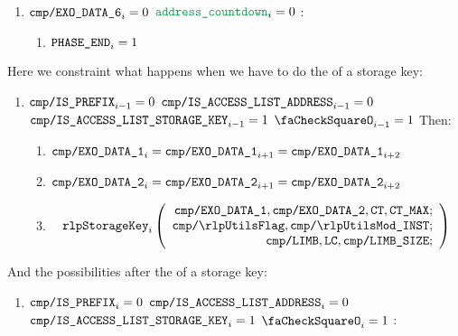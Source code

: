 \begin{enumerate}[resume]
\begin{enumerate}[resume]
\begin{enumerate}
					\item \If $\texttt{cmp}\texttt{/}\texttt{{\texttt{EXO\_DATA\_6}}} _{i} = 0$ \et $\locAddressPrewarmingCountdown _{i} = 0$ \Then:
						\begin{enumerate}
							\item $\texttt{PHASE\_END} _{i} = 1$
						\end{enumerate}
				\end{enumerate}
		\end{enumerate}

		Here we constraint what happens when we have to do the \rlp{} of a storage key:
		\begin{enumerate}[resume]
			\item \If $\texttt{cmp}\texttt{/}\texttt{{\texttt{IS\_PREFIX}}} _{i - 1} = 0$ \et $\texttt{cmp}\texttt{/}\texttt{{IS\_ACCESS\_LIST\_ADDRESS}} _{i - 1} = 0$ \et $\texttt{cmp}\texttt{/}\texttt{{IS\_ACCESS\_LIST\_STORAGE\_KEY}} _{i - 1} = 1$ \et $\done _{i - 1} =1$ Then:
				\begin{enumerate}
					\item $\texttt{cmp}\texttt{/}\texttt{{\texttt{EXO\_DATA\_1}}} _{i} = \texttt{cmp}\texttt{/}\texttt{{\texttt{EXO\_DATA\_1}}} _{i + 1} = \texttt{cmp}\texttt{/}\texttt{{\texttt{EXO\_DATA\_1}}} _{i + 2}$
					\item $\texttt{cmp}\texttt{/}\texttt{{\texttt{EXO\_DATA\_2}}} _{i} = \texttt{cmp}\texttt{/}\texttt{{\texttt{EXO\_DATA\_2}}} _{i + 1} = \texttt{cmp}\texttt{/}\texttt{{\texttt{EXO\_DATA\_2}}} _{i + 2}$
					\item \[
							\rlpStorageKey _{i}
							\left(
							\begin{array}{r}
								\rlpTxnComputationColumnExoDataColumn{1},
								\rlpTxnComputationColumnExoDataColumn{2},
								\ct,
								\maxCt; \\
								\rlpTxnComputationColumnRlpUtilsFlag,
								\rlpTxnComputationColumnRlpUtilsInstruction; \\
								\rlpTxnComputationColumnLimb,
								\lc,
								\rlpTxnComputationColumnLimbSize; \\
							\end{array}
							\right)
						\]
				\end{enumerate}
		\end{enumerate}
		And the possibilities after the \rlp{} of a storage key:
		\begin{enumerate}[resume]
			\item \If $\texttt{cmp}\texttt{/}\texttt{{\texttt{IS\_PREFIX}}} _{i} = 0$ \et $\texttt{cmp}\texttt{/}\texttt{{IS\_ACCESS\_LIST\_ADDRESS}} _{i} = 0$ \et $\texttt{cmp}\texttt{/}\texttt{{IS\_ACCESS\_LIST\_STORAGE\_KEY}} _{i} = 1$ \et $\done _{i} =1$ \Then:
				\begin{enumerate}

\end{enumerate}
\end{enumerate}
\end{enumerate}
